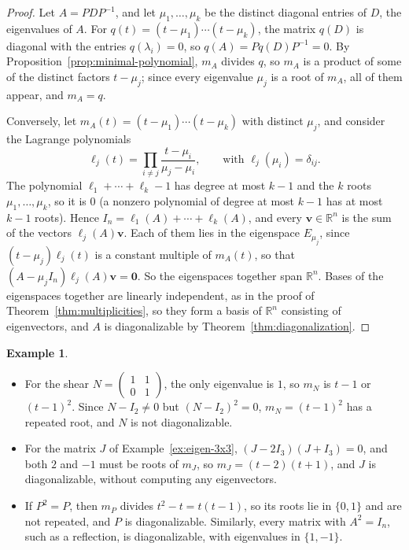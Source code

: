 \documentclass[11pt]{article}
\theoremstyle{definition}
\newtheorem{example}[definition]{Example}
\theoremstyle{plain}
\theoremstyle{remark}
\begin{document}
\begin{proof}
    Let $A = PDP^{-1}$, and let $\mu_1, \ldots, \mu_k$ be the distinct diagonal entries of $D$, the eigenvalues of $A$. For $q(t) = (t - \mu_1) \cdots (t - \mu_k)$, the matrix $q(D)$ is diagonal with the entries $q(\lambda_i) = 0$, so $q(A) = Pq(D)P^{-1} = 0$. By Proposition~\ref{prop:minimal-polynomial}, $m_A$ divides $q$, so $m_A$ is a product of some of the distinct factors $t - \mu_j$; since every eigenvalue $\mu_j$ is a root of $m_A$, all of them appear, and $m_A = q$.

    Conversely, let $m_A(t) = (t - \mu_1) \cdots (t - \mu_k)$ with distinct $\mu_j$, and consider the Lagrange polynomials
    \[\ell_j(t) = \prod_{i \neq j} \frac{t - \mu_i}{\mu_j - \mu_i}, \qquad \text{with } \ell_j(\mu_i) = \delta_{ij}.\]
    The polynomial $\ell_1 + \cdots + \ell_k - 1$ has degree at most $k - 1$ and the $k$ roots $\mu_1, \ldots, \mu_k$, so it is $0$ (a nonzero polynomial of degree at most $k - 1$ has at most $k - 1$ roots). Hence $I_n = \ell_1(A) + \cdots + \ell_k(A)$, and every $\mathbf{v} \in \mathbb{R}^n$ is the sum of the vectors $\ell_j(A)\mathbf{v}$. Each of them lies in the eigenspace $E_{\mu_j}$, since $(t - \mu_j)\ell_j(t)$ is a constant multiple of $m_A(t)$, so that $(A - \mu_jI_n)\ell_j(A)\mathbf{v} = \mathbf{0}$. So the eigenspaces together span $\mathbb{R}^n$. Bases of the eigenspaces together are linearly independent, as in the proof of Theorem~\ref{thm:multiplicities}, so they form a basis of $\mathbb{R}^n$ consisting of eigenvectors, and $A$ is diagonalizable by Theorem~\ref{thm:diagonalization}.
\end{proof}

\begin{example}\label{ex:minimal-polynomial}
    \begin{itemize}
        \item For the shear $N = \begin{pmatrix} 1 & 1 \\ 0 & 1 \end{pmatrix}$, the only eigenvalue is $1$, so $m_N$ is $t - 1$ or $(t - 1)^2$. Since $N - I_2 \neq 0$ but $(N - I_2)^2 = 0$, $m_N = (t - 1)^2$ has a repeated root, and $N$ is not diagonalizable.
        \item For the matrix $J$ of Example~\ref{ex:eigen-3x3}, $(J - 2I_3)(J + I_3) = 0$, and both $2$ and $-1$ must be roots of $m_J$, so $m_J = (t - 2)(t + 1)$, and $J$ is diagonalizable, without computing any eigenvectors.
        \item If $P^2 = P$, then $m_P$ divides $t^2 - t = t(t - 1)$, so its roots lie in $\{0, 1\}$ and are not repeated, and $P$ is diagonalizable. Similarly, every matrix with $A^2 = I_n$, such as a reflection, is diagonalizable, with eigenvalues in $\{1, -1\}$.
    \end{itemize}
\end{example}
\end{document}
